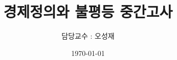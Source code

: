 \documentclass{article}
\begin{document}

\title{경제정의와 불평등 중간고사} %
\author{담당교수 : 오성재} %
\date{\today}

\maketitle

%
\end{document}
